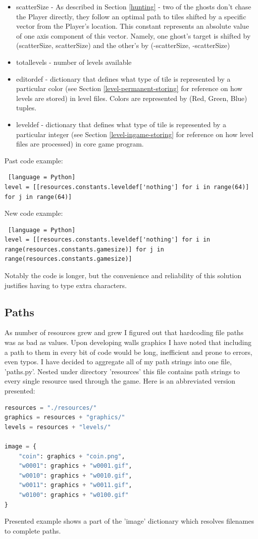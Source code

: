 \documentclass[11pt,a4paper]{report}
\newcommand{\dsubsection}[1]{\FloatBarrier \subsection{#1}}
\begin{document}
\begin{itemize}
					\item
						scatterSize - As described in Section \ref{hunting} - two of the ghosts don't chase the Player directly, they follow an optimal path to tiles shifted by a specific vector from the Player's location. This constant represents an absolute value of one axis component of this vector. Namely, one ghost's target is shifted by (scatterSize, scatterSize) and the other's by (-scatterSize, -scatterSize)
					\item
						totallevels - number of levels available
					\item
						editordef - dictionary that defines what type of tile is represented by a particular color (see Section \ref{level-permanent-storing} for reference on how levels are stored) in level files. Colors are represented by (Red, Green, Blue) tuples.
					\item
						leveldef - dictionary that defines what type of tile is represented by a particular integer (see Section \ref{level-ingame-storing} for reference on how level files are processed) in core game program.
				\end{itemize}
				Past code example:
				\begin{lstlisting} [language = Python]
level = [[resources.constants.leveldef['nothing'] for i in range(64)] for j in range(64)]
				\end{lstlisting}
				New code example:
				\begin{lstlisting} [language = Python]
level = [[resources.constants.leveldef['nothing'] for i in range(resources.constants.gamesize)] for j in range(resources.constants.gamesize)]
				\end{lstlisting}
				Notably the code is longer, but the convenience and reliability of this solution justifies having to type extra characters.
			\dsubsection{Paths}
				As number of resources grew and grew I figured out that hardcoding file paths was as bad as values. Upon developing walls graphics I have noted that including a path to them in every bit of code would be long, inefficient and prone to errors, even typos.
				I have decided to aggregate all of my path strings into one file, 'paths.py'. Nested under directory 'resources' this file contains path strings to every single resource used through the game.
				Here is an abbreviated version presented:
				\begin{lstlisting}[language=Python]
resources = "./resources/"
graphics = resources + "graphics/"
levels = resources + "levels/"

image = {
	"coin": graphics + "coin.png",
	"w0001": graphics + "w0001.gif",
	"w0010": graphics + "w0010.gif",
	"w0011": graphics + "w0011.gif",
	"w0100": graphics + "w0100.gif"
}
				\end{lstlisting}
				Presented example shows a part of the 'image' dictionary which resolves filenames to complete paths.
\end{document}
